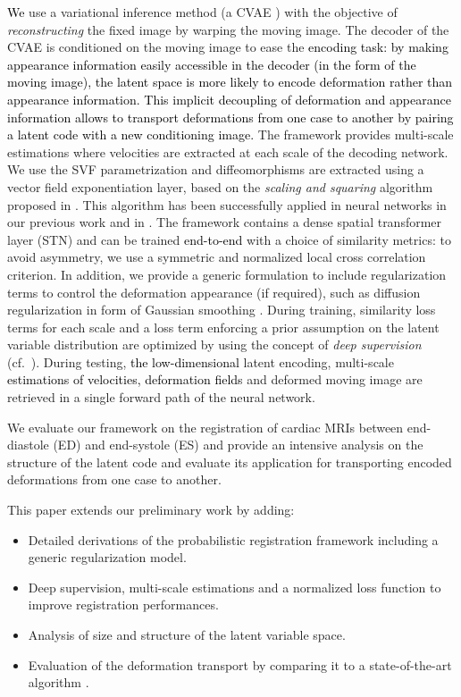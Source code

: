 \documentclass[journal]{IEEEtran}
\newcommand{\update}[1]{\textcolor{black}{#1}}
\begin{document}
\update{We} use a variational inference method (a CVAE \cite{kingma2014semi}) with the objective of \emph{reconstructing} the fixed image by warping the moving image. The decoder of the CVAE is conditioned on the moving image to ease the \update{encoding task: by making appearance information easily accessible in the decoder (in the form of the moving image), the latent space is more likely to encode deformation rather than appearance information. This implicit decoupling of deformation and appearance information allows to transport deformations from one case to another by pairing a latent code with a new conditioning image.} The framework provides multi-scale estimations where velocities are extracted at each scale of the decoding network. We use the SVF parametrization and diffeomorphisms are extracted using a vector field exponentiation layer, based on the \emph{scaling and squaring} algorithm proposed in \cite{arsigny2006log}. This algorithm has been successfully applied in neural networks in our previous work \cite{krebs2018unsupervised} and in \cite{dalca2018unsupervised}. The framework contains a dense spatial transformer layer (STN) and can be trained \update{end-to-end} with a choice of similarity metrics: to avoid asymmetry, we use a symmetric and normalized local cross correlation criterion. In addition, we provide a generic formulation to include regularization terms to control the deformation appearance (if required), such as diffusion regularization in form of Gaussian smoothing \cite{lorenzi2013lcc}. During training, similarity loss terms for each scale and a loss term enforcing a prior assumption on the latent variable distribution are optimized by using the concept of \emph{deep supervision} (cf.\ \cite{lee2015deeply}). During testing, \update{the low-dimensional} latent encoding, multi-scale \update{estimations of velocities, deformation fields} and deformed moving image are retrieved in a single forward path of the neural network. 

We evaluate our framework on the registration of cardiac MRIs between end-diastole (ED) and end-systole (ES) and provide an intensive analysis on the structure of the latent code and evaluate its application for transporting encoded deformations from one case to another. 

This paper extends our preliminary work \cite{krebs2018unsupervised} by adding:
\begin{itemize}[noitemsep]
\item Detailed derivations of the probabilistic registration framework including a generic regularization model.
\item Deep supervision, multi-scale estimations and a normalized loss function to improve registration performances.
\item Analysis of size and structure of the latent variable space.
\item Evaluation of the deformation transport by comparing it to a state-of-the-art algorithm \cite{lorenzi2014efficient}.
\end{itemize}
\end{document}
